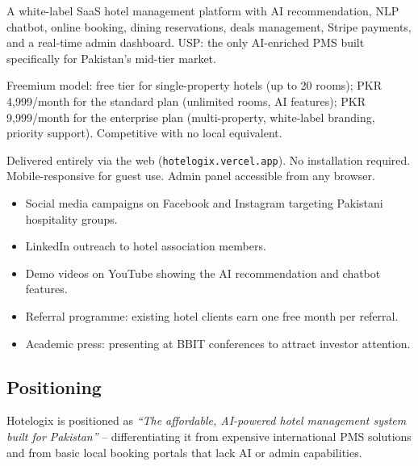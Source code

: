 \documentclass[12pt,a4paper]{report}
\begin{document}
\begin{description}[leftmargin=2.5cm, style=nextline]
  \item[\textbf{Product}]
    A white-label SaaS hotel management platform with AI recommendation, NLP chatbot, online booking, dining reservations, deals management, Stripe payments, and a real-time admin dashboard. USP: the only AI-enriched PMS built specifically for Pakistan's mid-tier market.

  \item[\textbf{Price}]
    Freemium model: free tier for single-property hotels (up to 20 rooms); PKR 4,999/month for the standard plan (unlimited rooms, AI features); PKR 9,999/month for the enterprise plan (multi-property, white-label branding, priority support). Competitive with no local equivalent.

  \item[\textbf{Place}]
    Delivered entirely via the web (\texttt{hotelogix.vercel.app}). No installation required. Mobile-responsive for guest use. Admin panel accessible from any browser.

  \item[\textbf{Promotion}]
    \begin{itemize}[nosep]
      \item Social media campaigns on Facebook and Instagram targeting Pakistani hospitality groups.
      \item LinkedIn outreach to hotel association members.
      \item Demo videos on YouTube showing the AI recommendation and chatbot features.
      \item Referral programme: existing hotel clients earn one free month per referral.
      \item Academic press: presenting at BBIT conferences to attract investor attention.
    \end{itemize}
\end{description}

\subsection*{Positioning}
Hotelogix is positioned as \textit{``The affordable, AI-powered hotel management system built for Pakistan''} -- differentiating it from expensive international PMS solutions and from basic local booking portals that lack AI or admin capabilities.

\end{document}

